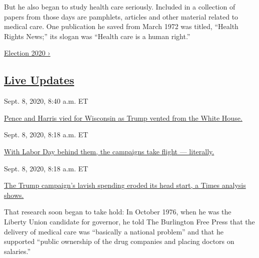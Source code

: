 But he also began to study health care seriously. Included in a
collection of papers from those days are pamphlets, articles and other
material related to medical care. One publication he saved from March
1972 was titled, ``Health Rights News;'' its slogan was ``Health care is
a human right.''

\href{https://www.nytimes3xbfgragh.onion/news-event/2020-election}{Election
2020 ›}

\hypertarget{live-updates}{%
\subsection{\texorpdfstring{\href{https://www.nytimes3xbfgragh.onion/live/2020/09/08/us/trump-vs-biden}{Live
Updates}}{Live Updates}}\label{live-updates}}

\href{https://www.nytimes3xbfgragh.onion/live/2020/09/08/us/trump-vs-biden\#pence-and-harris-vied-for-wisconsin-as-trump-vented-from-the-white-house}{}

Sept. 8, 2020, 8:40 a.m. ET

\href{https://www.nytimes3xbfgragh.onion/live/2020/09/08/us/trump-vs-biden\#pence-and-harris-vied-for-wisconsin-as-trump-vented-from-the-white-house}{Pence
and Harris vied for Wisconsin as Trump vented from the White
House.}\href{https://www.nytimes3xbfgragh.onion/live/2020/09/08/us/trump-vs-biden\#with-labor-day-behind-them-the-campaigns-take-flight-literally}{}

Sept. 8, 2020, 8:18 a.m. ET

\href{https://www.nytimes3xbfgragh.onion/live/2020/09/08/us/trump-vs-biden\#with-labor-day-behind-them-the-campaigns-take-flight-literally}{With
Labor Day behind them, the campaigns take flight ---
literally.}\href{https://www.nytimes3xbfgragh.onion/live/2020/09/08/us/trump-vs-biden\#the-trump-campaigns-lavish-spending-eroded-its-head-start-a-times-analysis-shows}{}

Sept. 8, 2020, 8:18 a.m. ET

\href{https://www.nytimes3xbfgragh.onion/live/2020/09/08/us/trump-vs-biden\#the-trump-campaigns-lavish-spending-eroded-its-head-start-a-times-analysis-shows}{The
Trump campaign's lavish spending eroded its head start, a Times analysis
shows.}

That research soon began to take hold: In October 1976, when he was the
Liberty Union candidate for governor, he told The Burlington Free Press
that the delivery of medical care was ``basically a national problem''
and that he supported ``public ownership of the drug companies and
placing doctors on salaries.''

